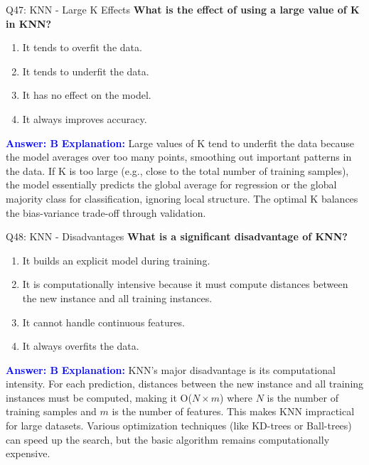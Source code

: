 \documentclass[8pt]{beamer}
\begin{document}
	\begin{frame}{Q47: KNN - Large K Effects}
		\fontsize{6.5}{7.5}\selectfont
		\textbf{What is the effect of using a large value of K in KNN?}
		\begin{enumerate}
			\item It tends to overfit the data.
			\item It tends to underfit the data.
			\item It has no effect on the model.
			\item It always improves accuracy.
		\end{enumerate}
		\vspace{0.1cm}
		\textcolor{blue}{\textbf{Answer: B}}
		\vspace{0.1cm}
		\textcolor{blue}{\textbf{Explanation:}} Large values of K tend to underfit the data because the model averages over too many points, smoothing out important patterns in the data. If K is too large (e.g., close to the total number of training samples), the model essentially predicts the global average for regression or the global majority class for classification, ignoring local structure. The optimal K balances the bias-variance trade-off through validation.
	\end{frame}
	
	\begin{frame}{Q48: KNN - Disadvantages}
		\fontsize{6.5}{7.5}\selectfont
		\textbf{What is a significant disadvantage of KNN?}
		\begin{enumerate}
			\item It builds an explicit model during training.
			\item It is computationally intensive because it must compute distances between the new instance and all training instances.
			\item It cannot handle continuous features.
			\item It always overfits the data.
		\end{enumerate}
		\vspace{0.1cm}
		\textcolor{blue}{\textbf{Answer: B}}
		\vspace{0.1cm}
		\textcolor{blue}{\textbf{Explanation:}} KNN's major disadvantage is its computational intensity. For each prediction, distances between the new instance and all training instances must be computed, making it O($N \times m$) where $N$ is the number of training samples and $m$ is the number of features. This makes KNN impractical for large datasets. Various optimization techniques (like KD-trees or Ball-trees) can speed up the search, but the basic algorithm remains computationally expensive.
	\end{frame}
	
\end{document}
